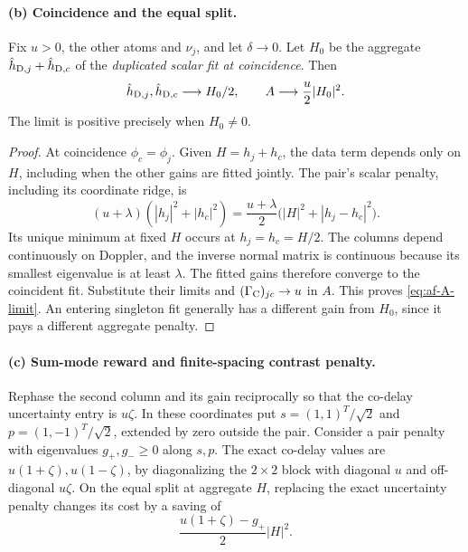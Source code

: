 \paragraph{(b) Coincidence and the equal split.}
Fix $u>0$, the other atoms and $\nu_j$, and let $\delta\to0$.
Let $H_0$ be the aggregate $\hat h_{{\rm D},j}+\hat h_{{\rm D},c}$ of
the \emph{duplicated scalar fit at coincidence}. Then
\begin{equation}
 \hat h_{{\rm D},j},\hat h_{{\rm D},c}\longrightarrow H_0/2,
 \qquad
 A\longrightarrow \frac u2|H_0|^2 .                    \label{eq:af-A-limit}
\end{equation}
The limit is positive precisely when $H_0\ne0$.

\begin{proof}
At coincidence $\phi_c=\phi_j$. Given $H=h_j+h_c$, the data term
depends only on $H$, including when the other gains are fitted jointly.
The pair's scalar penalty, including its coordinate ridge, is
\[
 (u+\lambda)(|h_j|^2+|h_c|^2)
 =\frac{u+\lambda}{2}\bigl(|H|^2+|h_j-h_c|^2\bigr).
\]
Its unique minimum at fixed $H$ occurs at $h_j=h_c=H/2$.
The columns depend continuously on Doppler, and the inverse normal
matrix is continuous because its smallest eigenvalue is at least
$\lambda$. The fitted gains therefore converge to the coincident fit.
Substitute their limits and $(\Gamma_{\rm C})_{jc}\to u$ in $A$.
This proves \eqref{eq:af-A-limit}. An entering singleton fit generally
has a different gain from $H_0$, since it pays a different aggregate
penalty.
\end{proof}

\paragraph{(c) Sum-mode reward and finite-spacing contrast penalty.}
Rephase the second column and its gain reciprocally so that the
co-delay uncertainty entry is $u\zeta$. In these coordinates put
$s=(1,1)^T/\sqrt2$ and $p=(1,-1)^T/\sqrt2$, extended by zero outside
the pair. Consider a pair penalty with eigenvalues $g_+,g_-\ge0$ along
$s,p$. The exact co-delay values are $u(1+\zeta),u(1-\zeta)$, by
diagonalizing the $2\times2$ block with diagonal $u$ and off-diagonal
$u\zeta$. On the equal split at aggregate $H$, replacing the exact
uncertainty penalty changes its cost by a saving of
\begin{equation}
 \frac{u(1+\zeta)-g_+}{2}|H|^2 .                       \label{eq:af-fixed-H}
\end{equation}

